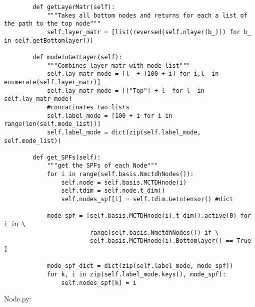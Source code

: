 \begin{verbatim}
        def getLayerMatr(self):
            """Takes all bottom nodes and returns for each a list of the path to the top node"""
            self.layer_matr = [list(reversed(self.nlayer(b_))) for b_ in self.getBottomlayer()]
    
        def modeToGetLayer(self):
            """Combines layer_matr with mode_list"""
            self.lay_matr_mode = [l_ + [100 + i] for i,l_ in enumerate(self.layer_matr)]
            self.lay_matr_mode = [["Top"] + l_ for l_ in self.lay_matr_mode]
            #concatinates two lists
            self.label_mode = [100 + i for i in range(len(self.mode_list))]
            self.label_mode = dict(zip(self.label_mode, self.mode_list))
    
        def get_SPFs(self):
            """get the SPFs of each Node"""
            for i in range(self.basis.NmctdhNodes()):
                self.node = self.basis.MCTDHnode(i)
                self.tdim = self.node.t_dim()
                self.nodes_spf[i] = self.tdim.GetnTensor() #dict
    
            mode_spf = [self.basis.MCTDHnode(i).t_dim().active(0) for i in \
                        range(self.basis.NmctdhNodes()) if \
                        self.basis.MCTDHnode(i).Bottomlayer() == True ]
    
            mode_spf_dict = dict(zip(self.label_mode, mode_spf))
            for k, i in zip(self.label_mode.keys(), mode_spf):
                self.nodes_spf[k] = i
\end{verbatim}

Node.py:

